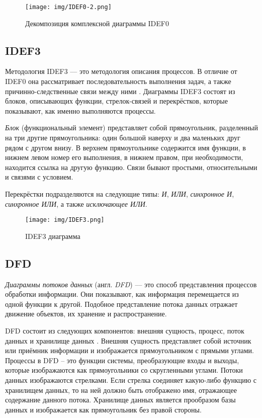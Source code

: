 \documentclass[14pt,russian]{extarticle}
\newcommand*\obj[1]{\textit{#1}}
\newcommand*\term[1]{\textit{#1}}
\begin{document}
\begin{figure}[H]
	\centering
	\texttt{[image: img/IDEF0-2.png]}
	\caption{Декомпозиция комплексной диаграммы IDEF0}
\end{figure}

\subsection{IDEF3}

Методология IDEF3 –-- это методология описания процессов. В отличие от IDEF0 она
рассматривает последовательность выполнения задач, а также причинно-следственные
связи между ними \cite{idef3}. Диаграммы IDEF3 состоят из блоков, описывающих функции,
стрелок-связей и перекрёстков, которые показывают, как именно выполняются
процессы.

\obj{Блок} (функциональный элемент) представляет собой прямоугольник, разделенный на
три другие прямоугольника: один большой наверху и два маленьких друг рядом с
другом внизу. В верхнем прямоугольнике содержится имя функции, в нижнем левом
номер его выполнения, в нижнем правом, при необходимости, находится ссылка на
другую функцию. Связи бывают простыми, относительными и связями с условием.

Перекрёстки подразделяются на следующие типы: \obj{И}, \obj{ИЛИ},
\obj{синхронное И}, \obj{синхронное ИЛИ}, а также \obj{исключающее ИЛИ}.

\begin{figure}[H]
	\centering
	\texttt{[image: img/IDEF3.png]}
	\caption{IDEF3 диаграмма}
\end{figure}

\subsection{DFD}

\term{Диаграммы потоков данных} (англ. \term{DFD}) –-- это способ представления
процессов обработки информации. Они показывают, как информация перемещается из
одной функции к другой. Подобное представление потока данных отражает движение
объектов, их хранение и распространение.

DFD состоит из следующих компонентов: внешняя сущность, процесс, поток данных и
хранилище данных \cite{dfd}. Внешняя сущность представляет собой источник или приёмник
информации и изображается прямоугольником с прямыми углами. Процессы в DFD – это
функции системы, преобразующие входы и выходы, которые изображаются как
прямоугольники со скругленными углами. Потоки данных изображаются стрелками.
Если стрелка соединяет какую-либо функцию с хранилищем данных, то на ней должно
быть отображено имя, отражающее содержание данного потока. Хранилище данных
является прообразом базы данных и изображается как прямоугольник без правой
стороны.
\end{document}
